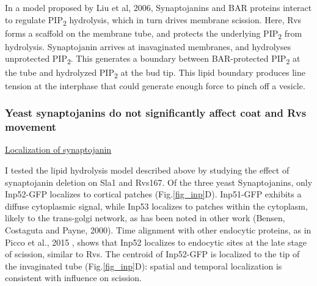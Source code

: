 \vspace{5mm}
In a model proposed by Liu et al, 2006, Synaptojanins and BAR proteins interact to regulate PIP\textsubscript{2} hydrolysis, which in turn drives membrane scission. Here, Rvs forms a scaffold on the membrane tube, and protects the underlying	PIP\textsubscript{2}  from hydrolysis. Synaptojanin arrives at inavaginated membranes, and hydrolyses unprotected	PIP\textsubscript{2}. This generates a boundary between BAR-protected 	PIP\textsubscript{2} at the tube and hydrolyzed PIP\textsubscript{2} at the bud tip. This lipid boundary produces line tension at the interphase that could generate enough force to pinch off a vesicle. 


	\subsubsection{Yeast synaptojanins do not significantly affect coat and Rvs movement } 
	
\underline{Localization of synaptojanin}

I tested the lipid hydrolysis model described above by studying the effect of synaptojanin deletion on Sla1 and Rvs167. 
Of the three yeast Synaptojanins, only Inp52-GFP localizes to cortical patches (Fig.\ref{fig_inp}D). Inp51-GFP exhibits a diffuse cytoplasmic signal, while Inp53 localizes to patches within the cytoplasm, likely to the trans-golgi network, as has been noted in other work (Bensen, Costaguta and Payne, 2000). Time alignment with other endocytic proteins, as in Picco et al., 2015 , shows that Inp52 localizes to endocytic sites at the late stage of scission, similar to Rvs. The centroid of Inp52-GFP is localized to the tip of the invaginated tube (Fig.\ref{fig_inp}D): spatial and temporal localization is consistent with influence on scission. 



